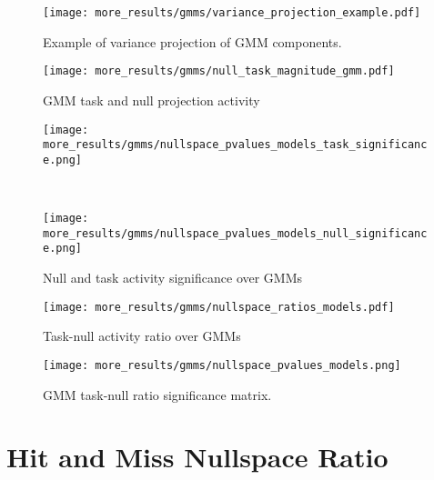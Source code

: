 \documentclass[../main.tex]{subfiles}
\begin{document}
\begin{figure}[H]%
  \centering
  \texttt{[image: more\_results/gmms/variance\_projection\_example.pdf]}
  \caption[Example of variance projection of GMM components]{Example of variance projection of GMM components.}\label{fig:variance_projection_example}
\end{figure}

\begin{figure}[H]%
  \centering
  \texttt{[image: more\_results/gmms/null\_task\_magnitude\_gmm.pdf]}
  \caption[GMM task and null projection activity]{GMM task and null projection activity}\label{fig:gmm_task_null_significance}
\end{figure}

\begin{figure}[H]%
  \centering
  \begin{minipage}{0.49\textwidth}
    \texttt{[image: more\_results/gmms/nullspace\_pvalues\_models\_task\_significance.png]}
    \subcaption{}
  \end{minipage}\\%
  \begin{minipage}{0.49\textwidth}
    \texttt{[image: more\_results/gmms/nullspace\_pvalues\_models\_null\_significance.png]}
    \subcaption{}
  \end{minipage}
  \caption[Null and task activity significance over GMMs]{Null and task activity significance over GMMs}\label{fig:null_task_magnitude_gmms}
\end{figure}

\begin{figure}[H]%
  \centering
  \texttt{[image: more\_results/gmms/nullspace\_ratios\_models.pdf]}
  \caption[Task-null activity ratio over GMMs]{Task-null activity ratio over GMMs}\label{fig:nullspace_gmms}
\end{figure}

\begin{figure}[H]%
  \centering
  \texttt{[image: more\_results/gmms/nullspace\_pvalues\_models.png]}
  \caption[GMM task-null ratio significance matrix]{GMM task-null ratio significance matrix.}\label{fig:gmm_task_null_activity}
\end{figure}






\section{Hit and Miss Nullspace Ratio}
\end{document}
